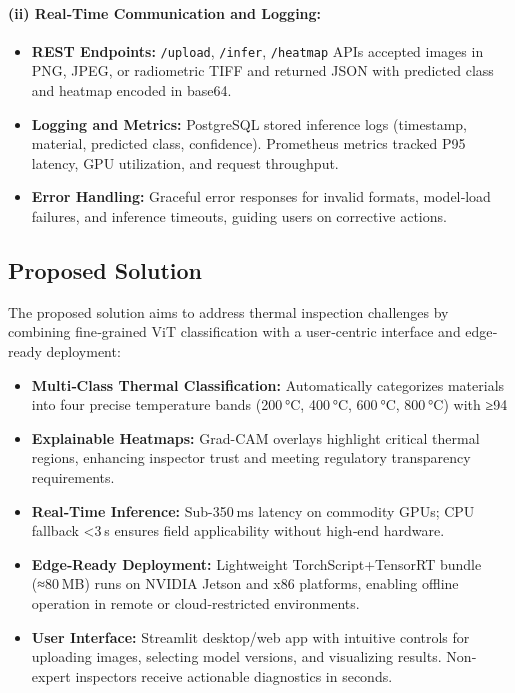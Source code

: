 \paragraph{(ii) Real‐Time Communication and Logging:}
\begin{itemize}
    \item \textbf{REST Endpoints:}  
    \texttt{/upload}, \texttt{/infer}, \texttt{/heatmap} APIs accepted images in PNG, JPEG, or radiometric TIFF and returned JSON with predicted class and heatmap encoded in base64.
    \item \textbf{Logging and Metrics:}  
    PostgreSQL stored inference logs (timestamp, material, predicted class, confidence). Prometheus metrics tracked P95 latency, GPU utilization, and request throughput.
    \item \textbf{Error Handling:}  
    Graceful error responses for invalid formats, model‐load failures, and inference timeouts, guiding users on corrective actions.
\end{itemize}

\subsection{Proposed Solution}
The proposed solution aims to address thermal inspection challenges by combining fine‐grained ViT classification with a user‐centric interface and edge‐ready deployment:

\begin{itemize}
    \item \textbf{Multi‐Class Thermal Classification:}  
    Automatically categorizes materials into four precise temperature bands (200 °C, 400 °C, 600 °C, 800 °C) with ≥94 %
    \item \textbf{Explainable Heatmaps:}  
    Grad-CAM overlays highlight critical thermal regions, enhancing inspector trust and meeting regulatory transparency requirements.
    \item \textbf{Real‐Time Inference:}  
    Sub-350 ms latency on commodity GPUs; CPU fallback <3 s ensures field applicability without high‐end hardware.
    \item \textbf{Edge‐Ready Deployment:}  
    Lightweight TorchScript+TensorRT bundle (≈80 MB) runs on NVIDIA Jetson and x86 platforms, enabling offline operation in remote or cloud‐restricted environments.
    \item \textbf{User Interface:}  
    Streamlit desktop/web app with intuitive controls for uploading images, selecting model versions, and visualizing results. Non‐expert inspectors receive actionable diagnostics in seconds.
\end{itemize}

